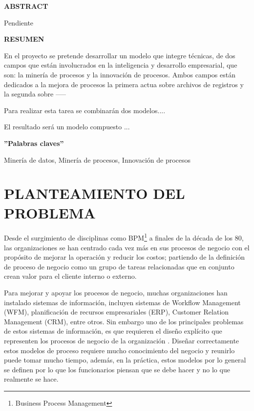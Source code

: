 \documentclass[a4paper, 11pt, titlepage]{article}
\begin{document}
\newpage
\thispagestyle{empty} %
\tableofcontents %
\thispagestyle{empty} %
\newpage
\thispagestyle{empty} %
\listoffigures
\newpage
\thispagestyle{empty} %
\listoftables
\newpage
\begin{center}
	\large{\textbf{ABSTRACT}}\\
\end{center}
Pendiente

\begin{center}
	\large{\textbf{RESUMEN}}\\
\end{center}
En el proyecto se pretende desarrollar un modelo que integre técnicas, de dos campos que están involucrados en la inteligencia y desarrollo empresarial, que son: la minería de procesos y la innovación de procesos. Ambos campos están dedicados a la mejora de procesos la primera actua sobre archivos de
registros y la segunda sobre ----- 

Para realizar esta tarea se combinarán dos modelos....

El resultado será un modelo compuesto ...

\textbf{''Palabras claves''}

Minería de datos, Minería de procesos, Innovación de procesos

\thispagestyle{empty} %
\newpage
\thispagestyle{empty} %

\newpage
\section{PLANTEAMIENTO DEL PROBLEMA} \label{sec:Planteamiento}

Desde el surgimiento de disciplinas como BPM\footnote{Business Process Management} a finales de la década de los 80, las organizaciones se han centrado cada vez más en sus procesos de negocio con el propósito de mejorar la operación y reducir los costos; partiendo de la definición de proceso de negocio como un grupo de tareas relacionadas que en conjunto crean valor para el cliente interno o externo\cite{hammer_reengineering_2006}.

Para mejorar y apoyar los procesos de negocio, muchas organizaciones han instalado sistemas de información, incluyen sistemas de Workflow Management (WFM), planificación de recursos empresariales (ERP), Customer Relation Management (CRM), entre otros. Sin embargo uno de los principales problemas de estos sistemas de información, es que requieren el diseño explícito que representen los procesos de negocio de la organización \cite{van_der_aalst_workflow_2003}. Diseñar correctamente estos modelos de proceso requiere mucho conocimiento del negocio y reunirlo puede tomar mucho tiempo, además, en la práctica, estos modelos por lo general se definen por lo que los funcionarios piensan que se debe hacer y no lo que realmente se hace.
\end{document}
